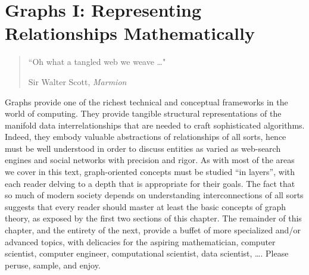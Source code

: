
\chapter{Graphs I:
Representing Relationships Mathematically}
\label{ch:Graphs1}

\begin{quote}
``Oh what a tangled web we weave \ldots" 

\hspace*{.75in}Sir Walter Scott, {\it Marmion}
\end{quote}

\bigskip

\noindent
Graphs provide one of the richest technical and conceptual frameworks in the world of computing.  They provide tangible structural representations of the manifold data interrelationships that are needed to craft sophisticated algorithms.  Indeed, they embody valuable abstractions of relationships of all sorts, hence must be well understood in order to discuss entities as varied as web-search engines and social networks with precision and rigor.  As with most of the areas we cover in this text, graph-oriented concepts must be studied ``in layers'', with each reader delving to a depth that is appropriate for their goals.   The fact that so much of modern society depends on understanding interconnections of all sorts suggests that every reader should master at least the basic concepts of graph theory, as exposed by the first two sections of this chapter.  The remainder of this chapter, and the entirety of the next, provide a buffet of more specialized and/or advanced topics, with delicacies for the aspiring mathematician, computer scientist,  computer engineer, computational scientist, data scientist, \ldots.  Please peruse, sample, and enjoy.

\smallskip

